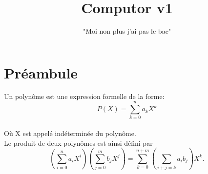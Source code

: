 \documentclass{42}
\begin{document}
                              \title{Computor v1}
                     \subtitle{"Moi non plus j'ai pas le bac"}


\maketitle

\tableofcontents


\chapter{Préambule}

    Un polynôme est une expression formelle de la forme:\\

	\begin{equation}
        P(X)=\sum_{k=0}^{n} a_k X^k
    \end{equation}\\

	Où X est appelé indéterminée du polynôme.\\

	Le produit de deux polynômes est ainsi défini par\\

	\begin{equation}
        \left(\sum_{i=0}^n a_iX^i\right)\left(\sum_{j=0}^m b_jX^j\right) = \sum_{k=0}^{n+m} \left(\sum_{i+j = k}a_ib_j\right)X^k.
	\end{equation}
\end{document}
